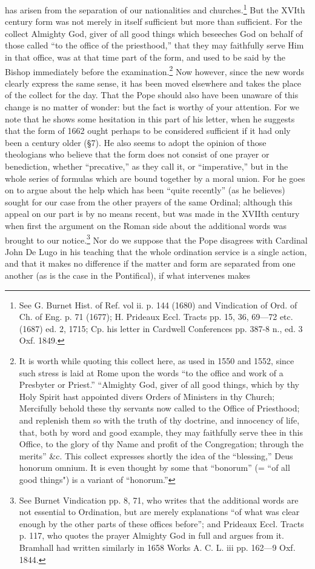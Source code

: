 has arisen from the separation of our nationalities and churches.\footnote{See G. Burnet Hist. of Ref. vol ii. p. 144 (1680) and Vindication of Ord. of Ch. of Eng. p. 71 (1677); H. Prideaux Eccl. Tracts pp. 15, 36, 69—72 etc. (1687) ed. 2, 1715; Cp. his letter in Cardwell Conferences pp. 387-8 n., ed. 3 Oxf. 1849.} But the XVIth century form was not merely in itself sufficient but more than sufficient. For the collect Almighty God, giver of all good things which beseeches God on behalf of those called “to the office of the priesthood,” that they may faithfully serve Him in that office, was at that time part of the form, and used to be said by the Bishop immediately before the examination.\footnote{It is worth while quoting this collect here, as used in 1550 and 1552, since such stress is laid at Rome upon the words “to the office and work of a Presbyter or Priest.” “Almighty God, giver of all good things, which by thy Holy Spirit hast appointed divers Orders of Ministers in thy Church; Mercifully behold these thy servants now called to the Office of Priesthood; and replenish them so with the truth of thy doctrine, and innocency of life, that, both by word and good example, they may faithfully serve thee in this Office, to the glory of thy Name and profit of the Congregation; through the merits” \&c. This collect expresses shortly the idea of the “blessing,” Deus honorum omnium. It is even thought by some that “bonorum” (= “of all good things") is a variant of “honorum.”} Now however, since the new words clearly express the same sense, it has been moved elsewhere and takes the place of the collect for the day. That the Pope should also have been unaware of this change is no matter of wonder: but the fact is worthy of your attention. For we note that he shows some hesitation in this part of his letter, when he suggests that the form of 1662 ought perhaps to be considered sufficient if it had only been a century older (§7). He also seems to adopt the opinion of those theologians who believe that the form does not consist of one prayer or benediction, whether “precative,” as they call it, or “imperative,” but in the whole series of formulas which are bound together by a moral union. For he goes on to argue about the help which has been “quite recently” (as he believes) sought for our case from the other prayers of the same Ordinal; although this appeal on our part is by no means recent, but was made in the XVIIth century when first the argument on the Roman side about the additional words was brought to our notice.\footnote{See Burnet Vindication pp. 8, 71, who writes that the additional words are not essential to Ordination, but are merely explanations “of what was clear enough by the other parts of these offices before”; and Prideaux Eccl. Tracts p. 117, who quotes the prayer Almighty God in full and argues from it. Bramhall had written similarly in 1658 Works A. C. L. iii pp. 162—9 Oxf. 1844.} Nor do we suppose that the Pope disagrees with Cardinal John De Lugo in his teaching that the whole ordination service is a single action, and that it makes no difference if the matter and form are separated from one another (as is the case in the Pontifical), if what intervenes makes

